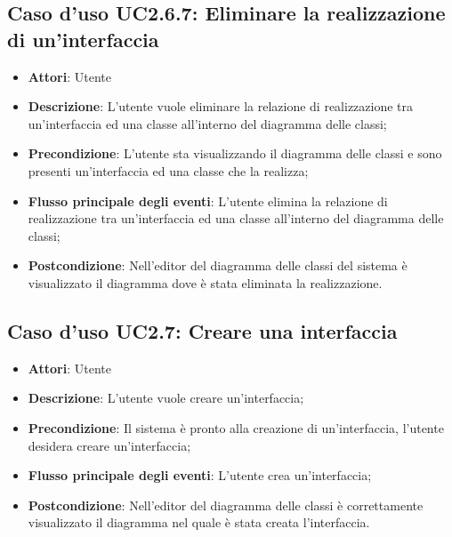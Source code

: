 \documentclass[../AnalisiDeiRequisiti.tex]{subfiles}
\begin{document}
		\subsection{Caso d'uso UC2.6.7: Eliminare la realizzazione di un'interfaccia}
		\begin{itemize}
			\item \textbf{Attori}: Utente
			\item \textbf{Descrizione}: L'utente vuole eliminare la relazione di realizzazione tra un'interfaccia ed una classe all'interno del diagramma delle classi;
			\item \textbf{Precondizione}: L'utente sta visualizzando il diagramma delle classi e sono presenti un'interfaccia ed una classe che la realizza;
			\item \textbf{Flusso principale degli eventi}: L'utente elimina la relazione di realizzazione tra un'interfaccia ed una classe all'interno del diagramma delle classi;
			\item \textbf{Postcondizione}: Nell'editor del diagramma delle classi del sistema è visualizzato il diagramma dove è stata eliminata la realizzazione.
		\end{itemize}
		\subsection{Caso d'uso UC2.7: Creare una interfaccia}
		\begin{itemize}
			\item \textbf{Attori}: Utente
			\item \textbf{Descrizione}: L'utente vuole creare un'interfaccia;
			\item \textbf{Precondizione}: Il sistema è pronto alla creazione di un'interfaccia, l'utente desidera creare un'interfaccia;
			\item \textbf{Flusso principale degli eventi}: L'utente crea un'interfaccia;
			\item \textbf{Postcondizione}: Nell'editor del diagramma delle classi è correttamente visualizzato il diagramma nel quale è stata creata l'interfaccia.
		\end{itemize}
\end{document}
